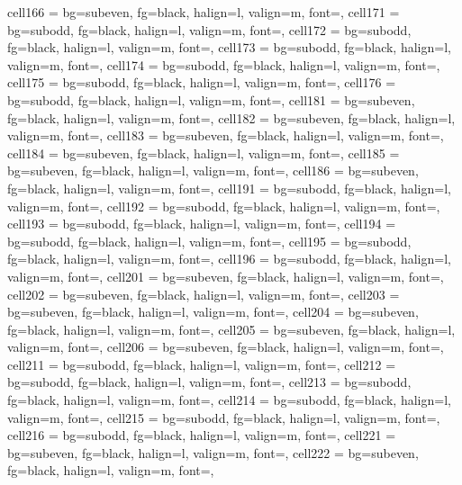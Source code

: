 \documentclass[a4paper,12pt]{article}
\begin{document}
\begin{longtblr}
{  cell{16}{6} = {bg=subeven, fg=black, halign=l, valign=m, font=\footnotesize},
  cell{17}{1} = {bg=subodd, fg=black, halign=l, valign=m, font=\footnotesize},
  cell{17}{2} = {bg=subodd, fg=black, halign=l, valign=m, font=\footnotesize},
  cell{17}{3} = {bg=subodd, fg=black, halign=l, valign=m, font=\footnotesize},
  cell{17}{4} = {bg=subodd, fg=black, halign=l, valign=m, font=\footnotesize},
  cell{17}{5} = {bg=subodd, fg=black, halign=l, valign=m, font=\footnotesize},
  cell{17}{6} = {bg=subodd, fg=black, halign=l, valign=m, font=\footnotesize},
  cell{18}{1} = {bg=subeven, fg=black, halign=l, valign=m, font=\footnotesize},
  cell{18}{2} = {bg=subeven, fg=black, halign=l, valign=m, font=\footnotesize},
  cell{18}{3} = {bg=subeven, fg=black, halign=l, valign=m, font=\footnotesize},
  cell{18}{4} = {bg=subeven, fg=black, halign=l, valign=m, font=\footnotesize},
  cell{18}{5} = {bg=subeven, fg=black, halign=l, valign=m, font=\footnotesize},
  cell{18}{6} = {bg=subeven, fg=black, halign=l, valign=m, font=\footnotesize},
  cell{19}{1} = {bg=subodd, fg=black, halign=l, valign=m, font=\footnotesize},
  cell{19}{2} = {bg=subodd, fg=black, halign=l, valign=m, font=\footnotesize},
  cell{19}{3} = {bg=subodd, fg=black, halign=l, valign=m, font=\footnotesize},
  cell{19}{4} = {bg=subodd, fg=black, halign=l, valign=m, font=\footnotesize},
  cell{19}{5} = {bg=subodd, fg=black, halign=l, valign=m, font=\footnotesize},
  cell{19}{6} = {bg=subodd, fg=black, halign=l, valign=m, font=\footnotesize},
  cell{20}{1} = {bg=subeven, fg=black, halign=l, valign=m, font=\footnotesize},
  cell{20}{2} = {bg=subeven, fg=black, halign=l, valign=m, font=\footnotesize},
  cell{20}{3} = {bg=subeven, fg=black, halign=l, valign=m, font=\footnotesize},
  cell{20}{4} = {bg=subeven, fg=black, halign=l, valign=m, font=\footnotesize},
  cell{20}{5} = {bg=subeven, fg=black, halign=l, valign=m, font=\footnotesize},
  cell{20}{6} = {bg=subeven, fg=black, halign=l, valign=m, font=\footnotesize},
  cell{21}{1} = {bg=subodd, fg=black, halign=l, valign=m, font=\footnotesize},
  cell{21}{2} = {bg=subodd, fg=black, halign=l, valign=m, font=\footnotesize},
  cell{21}{3} = {bg=subodd, fg=black, halign=l, valign=m, font=\footnotesize},
  cell{21}{4} = {bg=subodd, fg=black, halign=l, valign=m, font=\footnotesize},
  cell{21}{5} = {bg=subodd, fg=black, halign=l, valign=m, font=\footnotesize},
  cell{21}{6} = {bg=subodd, fg=black, halign=l, valign=m, font=\footnotesize},
  cell{22}{1} = {bg=subeven, fg=black, halign=l, valign=m, font=\footnotesize},
  cell{22}{2} = {bg=subeven, fg=black, halign=l, valign=m, font=\footnotesize},
}
\end{longtblr}
\end{document}
